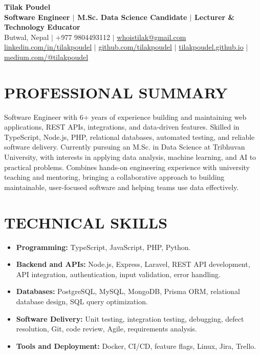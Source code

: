 \documentclass[10pt,a4paper]{article}
\begin{document}
\begin{center}
    {\huge \textbf{\color{primary}Tilak Poudel}} \\
    \vspace{2pt}
    \small \textbf{Software Engineer $|$ M.Sc. Data Science Candidate $|$ Lecturer \& Technology Educator} \\
    \vspace{4pt}
    \small Butwal, Nepal $|$ +977 9804493112 $|$ \href{mailto:whoistilak@gmail.com}{whoistilak@gmail.com} \\
    \vspace{2pt}
    \href{https://www.linkedin.com/in/tilak-poudel-654742159/}{linkedin.com/in/tilakpoudel} $|$
    \href{https://github.com/tilakpoudel}{github.com/tilakpoudel} $|$
    \href{https://tilakpoudel.github.io}{tilakpoudel.github.io} $|$
    \href{https://medium.com/@tilakpoudel}{medium.com/@tilakpoudel}
\end{center}

\section{PROFESSIONAL SUMMARY}
Software Engineer with 6+ years of experience building and maintaining web applications, REST APIs, integrations, and data-driven features. Skilled in TypeScript, Node.js, PHP, relational databases, automated testing, and reliable software delivery. Currently pursuing an M.Sc. in Data Science at Tribhuvan University, with interests in applying data analysis, machine learning, and AI to practical problems. Combines hands-on engineering experience with university teaching and mentoring, bringing a collaborative approach to building maintainable, user-focused software and helping teams use data effectively.

\section{TECHNICAL SKILLS}
\begin{itemize}
    \item \textbf{Programming:} TypeScript, JavaScript, PHP, Python.
    \item \textbf{Backend and APIs:} Node.js, Express, Laravel, REST API development, API integration, authentication, input validation, error handling.
    \item \textbf{Databases:} PostgreSQL, MySQL, MongoDB, Prisma ORM, relational database design, SQL query optimization.
    \item \textbf{Software Delivery:} Unit testing, integration testing, debugging, defect resolution, Git, code review, Agile, requirements analysis.
    \item \textbf{Tools and Deployment:} Docker, CI/CD, feature flags, Linux, Jira, Trello.
\end{itemize}
\end{document}
